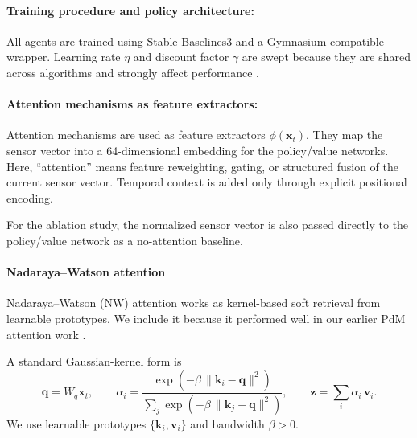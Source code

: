 \documentclass[sn-basic]{sn-jnl}%
\begin{document}
\paragraph{Training procedure and policy architecture:}
All agents are trained using Stable-Baselines3 and a Gymnasium-compatible wrapper. Learning rate $\eta$ and discount factor $\gamma$ are swept because they are shared across algorithms and strongly affect performance \cite{Henderson2019, Shala2022AutoRL, Eimer2023}.
  
\paragraph{Attention mechanisms as feature extractors:}
\label{sec:attention}

Attention mechanisms are used as feature extractors $\phi(\mathbf{x}_t)$. They map the sensor vector into a 64-dimensional embedding for the policy/value networks. Here, ``attention'' means feature reweighting, gating, or structured fusion of the current sensor vector. Temporal context is added only through explicit positional encoding.

For the ablation study, the normalized sensor vector is also passed directly to the policy/value network as a no-attention baseline.

\paragraph{Nadaraya--Watson attention}
Nadaraya--Watson (NW) attention works as kernel-based soft retrieval from learnable prototypes. We include it because it performed well in our earlier PdM attention work \cite{Siraskar2024}.

A standard Gaussian-kernel form is
\begin{equation}
        \mathbf{q}=W_q\mathbf{x}_t,\qquad
        \alpha_i = \frac{\exp\left(-\beta\,\lVert \mathbf{k}_i-\mathbf{q}\rVert^2\right)}{\sum_j \exp\left(-\beta\,\lVert \mathbf{k}_j-\mathbf{q}\rVert^2\right)},
        \qquad \mathbf{z}=\sum_i\alpha_i\,\mathbf{v}_i.
\end{equation}
We use learnable prototypes $\{\mathbf{k}_i,\mathbf{v}_i\}$ and bandwidth $\beta>0$.
\end{document}
